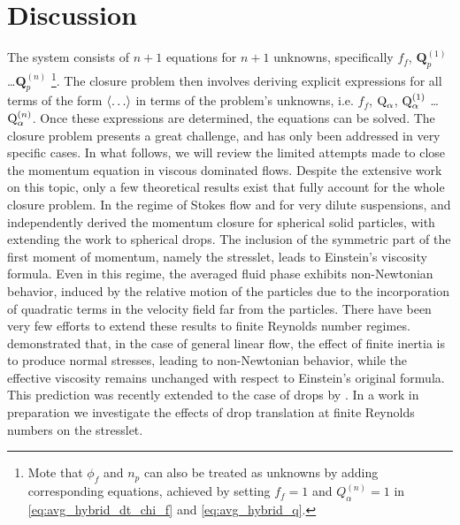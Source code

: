 \documentclass[11pt]{My_preprint}
\providecommand{\DIFadd}[1]{{\protect\color{blue}\uwave{#1}}} %
\providecommand{\DIFaddbegin}{} %
\providecommand{\DIFaddend}{} %
\begin{document}
 





\section{Discussion}
\label{sec:conclusion}
The system consists of $n+1$ equations for $n+1$ unknowns, specifically $f_f$, $\textbf{Q}_p^{(1)}$\ldots$\textbf{Q}_p^{(n)}$ \footnote{Mote that $\phi_f$ and $n_p$ can also be treated as unknowns by adding corresponding equations, achieved by setting $f_f=1$ and $Q_\alpha^{(n)} =1$ in \ref{eq:avg_hybrid_dt_chi_f} and \ref{eq:avg_hybrid_q}.}.
 The closure problem then involves deriving explicit expressions for all terms of \DIFaddbegin \DIFadd{\ref{eq:avg_hybrid_dt_chi_f} to \ref{eq:avg_hybrid_q_1}, of }\DIFaddend the form $\left<\ldots\right>$ in terms of the problem's unknowns, i.e. 
 $f_f$, $\text Q_\alpha$, $\text Q_\alpha^{(1)}$ \ldots $ \text Q_\alpha^{(n)}$.  
 Once these expressions are determined, the equations can be solved. 
 The closure problem presents a great challenge, and has only been addressed in very specific cases. 
 In what follows, we will review the limited attempts made to close the momentum equation in viscous dominated flows. 
 Despite the extensive work on this topic, only a few theoretical results exist that fully account for the whole closure problem. 
 In the regime of Stokes flow and for very dilute suspensions, \citet{jackson1997locally} and \citet{zhang1997momentum} independently derived the momentum closure for spherical solid particles, with \citet{zhang1997momentum} extending the work to spherical drops. 
 The inclusion of the symmetric part of the first moment of momentum, namely the stresslet, leads to Einstein's viscosity formula. 
 Even in this regime, the averaged fluid phase exhibits non-Newtonian behavior, induced by the relative motion of the particles due to the incorporation of quadratic terms in the velocity field far from the particles.
 There have been very few efforts to extend these results to finite Reynolds number regimes. \citet{stone2001inertial} demonstrated that, in the case of general linear flow, the effect of finite inertia is to produce normal stresses, leading to non-Newtonian behavior, while the effective viscosity remains unchanged with respect to Einstein's original formula. 
 This prediction was recently extended to the case of drops by \citet{raja2010inertial}. 
 In a work in preparation we investigate the effects of drop translation at finite Reynolds numbers on the stresslet.
\end{document}

